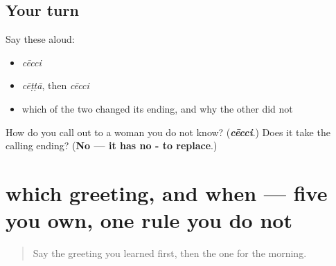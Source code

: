 \subsection*{Your turn}
Say these aloud:

\begin{itemize}
\raggedright
  \item \emph{cēcci}
  \item \emph{cēṭṭā}, then \emph{cēcci}
  \item which of the two changed its ending, and why the other did not
\end{itemize}

\begin{tcolorbox}[breakable,colback=teal!4,colframe=teal!35!black,title={Before you move on}]
How do you call out to a woman you do not know? (\emph{\textbf{cēcci}}.) Does it take the calling ending? (\textbf{No — it has no - to replace}.)
\end{tcolorbox}
\section[which greeting, and when]{which greeting, and when — five you own, one rule you do not}

\label{lesson:ML-C82-greeting-register}



\begin{quote}
Say the greeting you learned first, then the one for the morning.
\end{quote}

